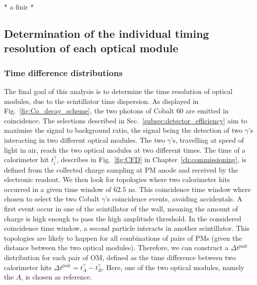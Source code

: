 

* a finir *

\subsection{Determination of the individual timing resolution of each optical module}


\subsubsection*{Time difference distributions}

The final goal of this analysis is to determine the time resolution of optical modules, due to the scintillator time dispersion.
As displayed in Fig.~\ref{fig:Co_decay_scheme}, the two photons of Cobalt $60$ are emitted in coincidence.
The selections described in Sec.~\ref{subsec:detector_efficiency} aim to maximise the signal to background ratio, the signal being the detection of two $\gamma$'s interacting in two different optical modules.
The two $\gamma$'s, travelling at speed of light in air, reach the two optical modules at two different times.
The time of a calorimeter hit $t^{\gamma}_{i}$, describes in Fig.~\ref{fig:CFD} in Chapter~\ref{ch:commissioning}, is defined from the collected charge sampling at PM anode and received by the electronic readout.
We then look for topologies where two calorimeter hits occurred in a given time window of $62.5$ ns.
This coincidence time window where chosen to select the two Cobalt $\gamma$'s coincidence events, avoiding accidentals.
A first event occur in one of the scintillator of the wall, meaning the amount of charge is high enough to pass the high amplitude threshold.
In the considered coincidence time window, a second particle interacts in another scintillator.
This topologies are likely to happen for all combinations of pairs of PMs (given the distance between the two optical modules).
Therefore, we can construct a $\Delta t^{\text{pair}}$ distribution for each pair of OM, defined as the time difference between two calorimeter hits $\Delta t^{\text{pair}} = t^{\gamma}_{A} - t^{\gamma}_{B}$.
Here, one of the two optical modules, namely the $A$, is chosen as reference.

